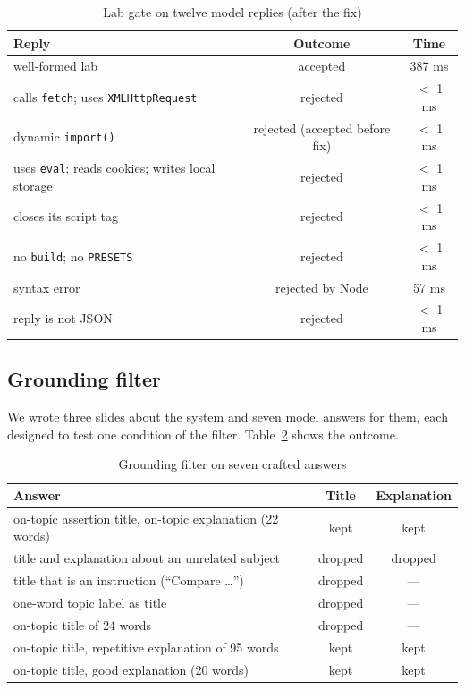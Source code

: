 \documentclass[runningheads]{llncs}
\begin{document}
\begin{table}[H]
\centering
\caption{Lab gate on twelve model replies (after the fix)}
\label{tab:gate}
\begin{tabular}{p{5.0cm}cc}
\toprule
Reply & Outcome & Time \\
\midrule
well-formed lab & accepted & 387 ms \\
calls \texttt{fetch}; uses \texttt{XMLHttpRequest} & rejected & $<$ 1 ms \\
dynamic \texttt{import()} & rejected (accepted before fix) & $<$ 1 ms \\
uses \texttt{eval}; reads cookies; writes local storage & rejected & $<$ 1 ms \\
closes its script tag & rejected & $<$ 1 ms \\
no \texttt{build}; no \texttt{PRESETS} & rejected & $<$ 1 ms \\
syntax error & rejected by Node & 57 ms \\
reply is not JSON & rejected & $<$ 1 ms \\
\bottomrule
\end{tabular}
\end{table}

\subsection{Grounding filter}
We wrote three slides about the system and seven model answers for them, each designed to test one condition of the filter.
Table~\ref{tab:ground} shows the outcome.

\begin{table}[H]
\centering
\caption{Grounding filter on seven crafted answers}
\label{tab:ground}
\begin{tabular}{p{6.6cm}cc}
\toprule
Answer & Title & Explanation \\
\midrule
on-topic assertion title, on-topic explanation (22 words) & kept & kept \\
title and explanation about an unrelated subject & dropped & dropped \\
title that is an instruction (``Compare \ldots'') & dropped & --- \\
one-word topic label as title & dropped & --- \\
on-topic title of 24 words & dropped & --- \\
on-topic title, repetitive explanation of 95 words & kept & kept \\
on-topic title, good explanation (20 words) & kept & kept \\
\bottomrule
\end{tabular}
\end{table}
\end{document}
